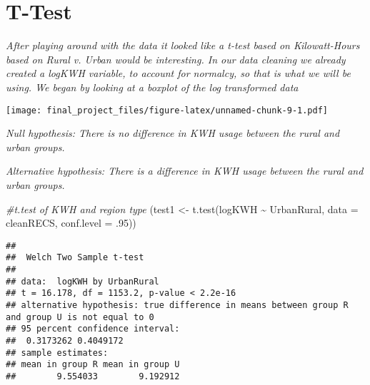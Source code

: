 \documentclass[
]{article}
\newenvironment{Shaded}{\begin{snugshade}}{\end{snugshade}}
\newcommand{\AttributeTok}[1]{\textcolor[rgb]{0.77,0.63,0.00}{#1}}
\newcommand{\CommentTok}[1]{\textcolor[rgb]{0.56,0.35,0.01}{\textit{#1}}}
\newcommand{\DecValTok}[1]{\textcolor[rgb]{0.00,0.00,0.81}{#1}}
\newcommand{\FunctionTok}[1]{\textcolor[rgb]{0.00,0.00,0.00}{#1}}
\newcommand{\NormalTok}[1]{#1}
\newcommand{\OtherTok}[1]{\textcolor[rgb]{0.56,0.35,0.01}{#1}}
\newcommand{\SpecialCharTok}[1]{\textcolor[rgb]{0.00,0.00,0.00}{#1}}
\newcommand{\StringTok}[1]{\textcolor[rgb]{0.31,0.60,0.02}{#1}}
\begin{document}
\hypertarget{t-test}{%
\section{T-Test}\label{t-test}}

\emph{After playing around with the data it looked like a t-test based
on Kilowatt-Hours based on Rural v. Urban would be interesting. In our
data cleaning we already created a logKWH variable, to account for
normalcy, so that is what we will be using. We began by looking at a
boxplot of the log transformed data}

\begin{Shaded}
\end{Shaded}

\texttt{[image: final\_project\_files/figure-latex/unnamed-chunk-9-1.pdf]}

\emph{Null hypothesis: There is no difference in KWH usage between the
rural and urban groups.}

\emph{Alternative hypothesis: There is a difference in KWH usage between
the rural and urban groups.}

\begin{Shaded}
\begin{Highlighting}[]
\CommentTok{\#t.test of KWH and region type }
\NormalTok{(test1 }\OtherTok{\textless{}{-}} \FunctionTok{t.test}\NormalTok{(logKWH }\SpecialCharTok{\textasciitilde{}}\NormalTok{ UrbanRural, }\AttributeTok{data =}\NormalTok{ cleanRECS, }\AttributeTok{conf.level =}\NormalTok{ .}\DecValTok{95}\NormalTok{))}
\end{Highlighting}
\end{Shaded}

\begin{verbatim}
## 
##  Welch Two Sample t-test
## 
## data:  logKWH by UrbanRural
## t = 16.178, df = 1153.2, p-value < 2.2e-16
## alternative hypothesis: true difference in means between group R and group U is not equal to 0
## 95 percent confidence interval:
##  0.3173262 0.4049172
## sample estimates:
## mean in group R mean in group U 
##        9.554033        9.192912
\end{verbatim}
\end{document}
